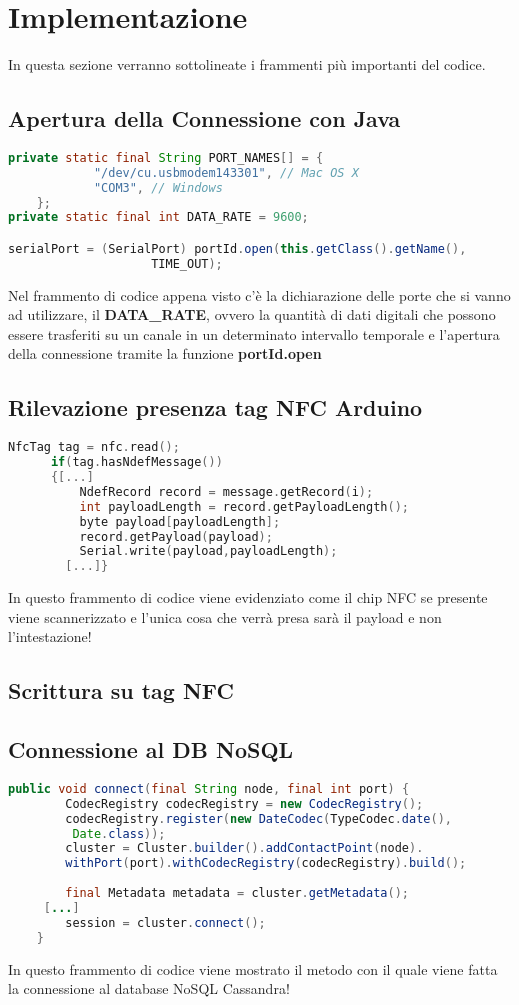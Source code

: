\section{Implementazione}

In questa sezione verranno sottolineate i frammenti più importanti del codice.
\subsection{Apertura della Connessione con Java}
\begin{lstlisting}[language=Java]
private static final String PORT_NAMES[] = { 
			"/dev/cu.usbmodem143301", // Mac OS X
			"COM3", // Windows
	};
private static final int DATA_RATE = 9600;

serialPort = (SerialPort) portId.open(this.getClass().getName(),
					TIME_OUT);

\end{lstlisting}
Nel frammento di codice appena visto c'è la dichiarazione delle porte che si vanno ad utilizzare, il \textbf{DATA\_RATE}, ovvero la quantità di dati digitali che possono essere trasferiti su un canale in un determinato intervallo temporale e l'apertura della connessione tramite la funzione \textbf{portId.open}

\subsection{Rilevazione presenza tag NFC Arduino}
\begin{lstlisting}[language=c++]
      NfcTag tag = nfc.read(); 
      if(tag.hasNdefMessage())
      {[...]    
          NdefRecord record = message.getRecord(i);
          int payloadLength = record.getPayloadLength();
          byte payload[payloadLength];
          record.getPayload(payload);
          Serial.write(payload,payloadLength);
        [...]}
\end{lstlisting}
In questo frammento di codice viene evidenziato come il chip NFC se presente viene scannerizzato e l'unica cosa che verrà presa sarà il payload e non l'intestazione! 
\subsection{Scrittura su tag NFC}
\subsection{Connessione al DB NoSQL}
\begin{lstlisting}[language=Java]
public void connect(final String node, final int port) {
		CodecRegistry codecRegistry = new CodecRegistry();
		codecRegistry.register(new DateCodec(TypeCodec.date(),
		 Date.class));
		cluster = Cluster.builder().addContactPoint(node).
		withPort(port).withCodecRegistry(codecRegistry).build();
 
		final Metadata metadata = cluster.getMetadata();
	 [...]
		session = cluster.connect();
	}
\end{lstlisting}
In questo frammento di codice viene mostrato il metodo con il quale viene fatta la connessione al database NoSQL Cassandra!
